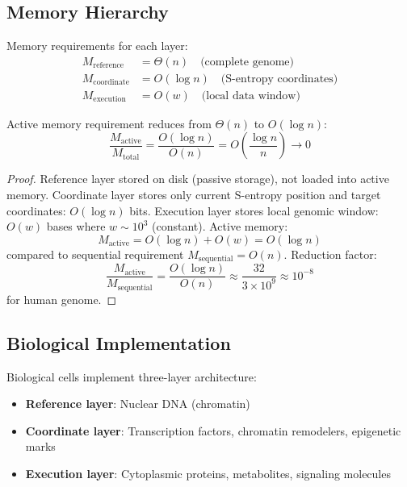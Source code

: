 \subsection{Memory Hierarchy}

\begin{definition}
\label{def:memory_hierarchy}
Memory requirements for each layer:
\begin{align}
M_{\text{reference}} &= \Theta(n) \quad \text{(complete genome)} \\
M_{\text{coordinate}} &= O(\log n) \quad \text{(S-entropy coordinates)} \\
M_{\text{execution}} &= O(w) \quad \text{(local data window)}
\end{align}
\end{definition}

\begin{theorem}
\label{thm:memory_reduction_layering}
Active memory requirement reduces from $\Theta(n)$ to $O(\log n)$:
\begin{equation}
\frac{M_{\text{active}}}{M_{\text{total}}} = \frac{O(\log n)}{O(n)} = O\left(\frac{\log n}{n}\right) \to 0
\end{equation}
\end{theorem}

\begin{proof}
Reference layer stored on disk (passive storage), not loaded into active memory. Coordinate layer stores only current S-entropy position and target coordinates: $O(\log n)$ bits. Execution layer stores local genomic window: $O(w)$ bases where $w \sim 10^3$ (constant). Active memory:
\begin{equation}
M_{\text{active}} = O(\log n) + O(w) = O(\log n)
\end{equation}
compared to sequential requirement $M_{\text{sequential}} = O(n)$. Reduction factor:
\begin{equation}
\frac{M_{\text{active}}}{M_{\text{sequential}}} = \frac{O(\log n)}{O(n)} \approx \frac{32}{3 \times 10^9} \approx 10^{-8}
\end{equation}
for human genome.
\end{proof}

\subsection{Biological Implementation}

\begin{proposition}
\label{prop:cellular_realization}
Biological cells implement three-layer architecture:
\begin{itemize}
\item \textbf{Reference layer}: Nuclear DNA (chromatin)
\item \textbf{Coordinate layer}: Transcription factors, chromatin remodelers, epigenetic marks
\item \textbf{Execution layer}: Cytoplasmic proteins, metabolites, signaling molecules
\end{itemize}
\end{proposition}

